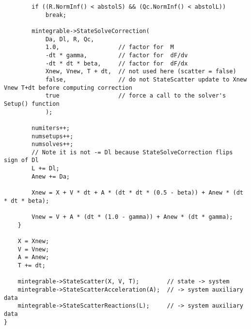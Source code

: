 \begin{verbatim}
        if ((R.NormInf() < abstolS) && (Qc.NormInf() < abstolL))
            break;

        mintegrable->StateSolveCorrection(
            Da, Dl, R, Qc,
            1.0,                 // factor for  M
            -dt * gamma,         // factor for  dF/dv
            -dt * dt * beta,     // factor for  dF/dx
            Xnew, Vnew, T + dt,  // not used here (scatter = false)
            false,               // do not StateScatter update to Xnew Vnew T+dt before computing correction
            true                 // force a call to the solver's Setup() function
            );

        numiters++;
        numsetups++;
        numsolves++;
        // Note it is not -= Dl because StateSolveCorrection flips sign of Dl
        L += Dl;  
        Anew += Da;

        Xnew = X + V * dt + A * (dt * dt * (0.5 - beta)) + Anew * (dt * dt * beta);

        Vnew = V + A * (dt * (1.0 - gamma)) + Anew * (dt * gamma);
    }

    X = Xnew;
    V = Vnew;
    A = Anew;
    T += dt;

    mintegrable->StateScatter(X, V, T);        // state -> system
    mintegrable->StateScatterAcceleration(A);  // -> system auxiliary data
    mintegrable->StateScatterReactions(L);     // -> system auxiliary data
}
\end{verbatim}